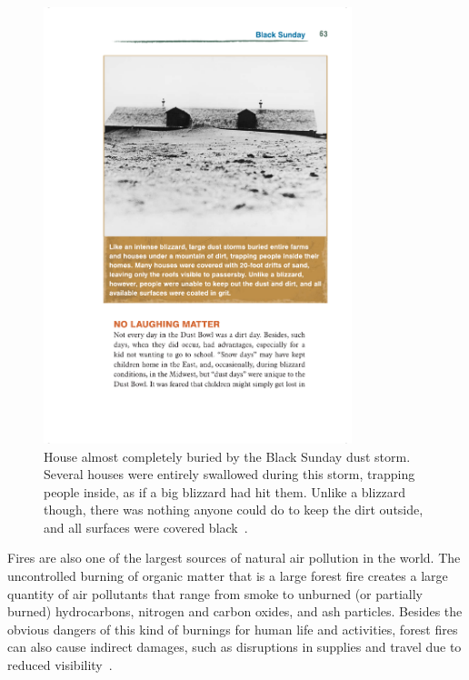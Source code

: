 \begin{figure}[htpb]
    \centering
    \includegraphics[clip,%
        trim=4.3cm 15cm 2cm 3.6cm,%
        width=0.8\textwidth]{img/pdf/dust.pdf}
        \caption{House almost completely buried by the Black Sunday dust
            storm. Several houses were entirely swallowed during this
            storm, trapping people inside, as if a big blizzard had hit
            them. Unlike a blizzard though, there was nothing anyone
            could do to keep the dirt outside, and all surfaces were
            covered black~\cite{Reis2008}.}
    \label{fig:dust1935}
\end{figure}

Fires are also one of the largest sources of natural air pollution in
the world. The uncontrolled burning of organic matter that is a large
forest fire creates a large quantity of air pollutants that range from
smoke to unburned (or partially burned) hydrocarbons, nitrogen and carbon
oxides, and ash particles. Besides the obvious dangers of this kind of
burnings for human life and activities, forest fires can also cause
indirect damages, such as disruptions in supplies and travel due to
reduced visibility~\cite{Vallero2014}.

